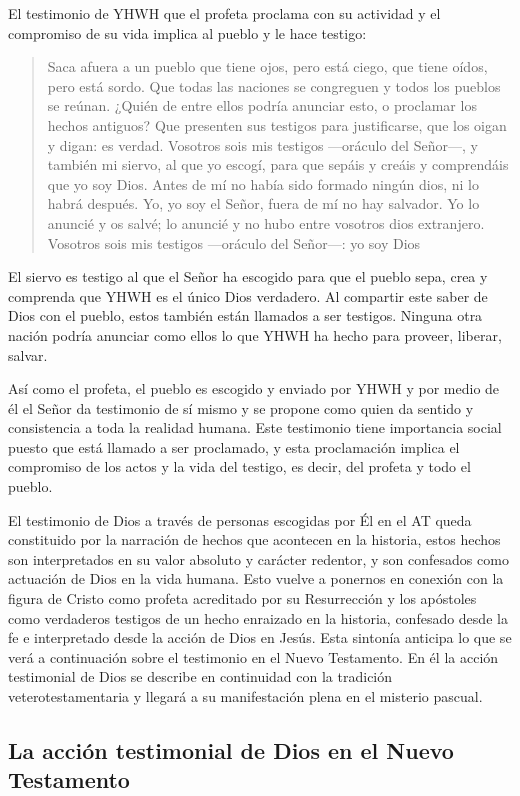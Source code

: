 El testimonio de YHWH que el profeta proclama con su actividad y el compromiso de su vida implica al pueblo y le hace testigo: \blockquote[][\,(Is 43,8-12)]{Saca afuera a un pueblo que tiene ojos, pero está ciego, que tiene oídos, pero está sordo. Que todas las naciones se congreguen y todos los pueblos se reúnan. ¿Quién de entre ellos podría anunciar esto, o proclamar los hechos antiguos? Que presenten sus testigos para justificarse, que los oigan y digan: es verdad. Vosotros sois mis testigos ---oráculo del Señor---, y también mi siervo, al que yo escogí, para que sepáis y creáis y comprendáis que yo soy Dios. Antes de mí no había sido formado ningún dios, ni lo habrá después. Yo, yo soy el Señor, fuera de mí no hay salvador. Yo lo anuncié y os salvé; lo anuncié y no hubo entre vosotros dios extranjero. Vosotros sois mis testigos ---oráculo del Señor---: yo soy Dios}. El siervo es testigo al que el Señor ha escogido para que el pueblo sepa, crea y comprenda que YHWH es el único Dios verdadero. Al compartir este saber de Dios con el pueblo, estos también están llamados a ser testigos. Ninguna otra nación podría anunciar como ellos lo que YHWH ha hecho para proveer, liberar, salvar.

Así como el profeta, el pueblo es escogido y enviado por YHWH y por medio de él el Señor da testimonio de sí mismo y se propone como quien da sentido y consistencia a toda la realidad humana. Este testimonio tiene importancia social puesto que está llamado a ser proclamado, y esta proclamación implica el compromiso de los actos y la vida del testigo, es decir, del profeta y todo el pueblo\autocite[Cf.][1526-1527]{latourelle2000testimonio}.

El testimonio de Dios a través de personas escogidas por Él en el AT queda constituido por la narración de hechos que acontecen en la historia, estos hechos son interpretados en su valor absoluto y carácter redentor, y son confesados como actuación de Dios en la vida humana\autocite[Cf.][119]{prades2015testimonio}. Esto vuelve a ponernos en conexión con la figura de Cristo como profeta acreditado por su Resurrección y los apóstoles como verdaderos testigos de un hecho enraizado en la historia, confesado desde la fe e interpretado desde la acción de Dios en Jesús. Esta sintonía anticipa lo que se verá a continuación sobre el testimonio en el Nuevo Testamento. En él la acción testimonial de Dios se describe en continuidad con la tradición veterotestamentaria y llegará a su manifestación plena en el misterio pascual.

\subsection{La acción testimonial de Dios en el Nuevo Testamento}

